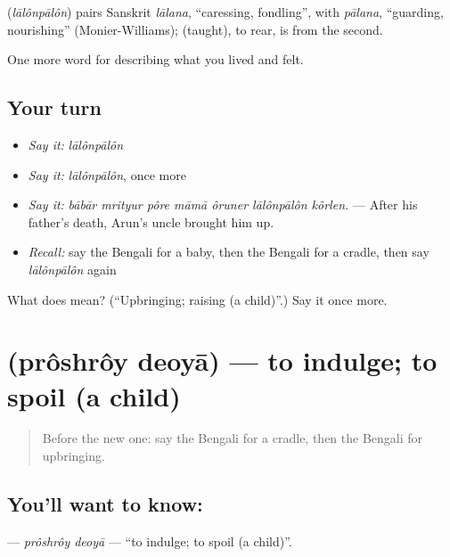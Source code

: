 \begin{cousinweb}
\textbf{} (\emph{lālônpālôn}) pairs Sanskrit \emph{lālana}, \textquotedblleft{}caressing, fondling\textquotedblright{}, with \emph{pālana}, \textquotedblleft{}guarding, nourishing\textquotedblright{} (Monier-Williams);  (taught), to rear, is from the second.
\end{cousinweb}

\begin{grammarlens}[title={What you've built}]
One more word for describing what you lived and felt.
\end{grammarlens}

\subsection*{Your turn}
\begin{itemize}
\raggedright
  \item \emph{Say it:} \emph{lālônpālôn}
  \item \emph{Say it:} \emph{lālônpālôn}, once more
  \item \emph{Say it:} \emph{bābār mrityur pôre māmā ôruner lālônpālôn kôrlen.} — After his father's death, Arun's uncle brought him up.
  \item \emph{Recall:} say the Bengali for a baby, then the Bengali for a cradle, then say \emph{lālônpālôn} again
\end{itemize}

\begin{tcolorbox}[breakable,colback=teal!4,colframe=teal!35!black,title={Before you move on}]
What does  mean? (\textquotedblleft{}Upbringing; raising (a child)\textquotedblright{}.) Say it once more.
\end{tcolorbox}
\section[\texorpdfstring{\bn{প্রশ্রয়} \bn{দেওয়া} (prôshrôy deoyā)}{প্রশ্রয় দেওয়া (prôshrôy deoyā)}]{  (prôshrôy deoyā) — to indulge; to spoil (a child)}

\label{lesson:BN-C486-proshroy-deoya}



\begin{quote}
Before the new one: say the Bengali for a cradle, then the Bengali for upbringing.
\end{quote}

\subsection*{You'll want to know:  }
\textbf{ } — \emph{prôshrôy deoyā} — \textquotedblleft{}to indulge; to spoil (a child)\textquotedblright{}.

